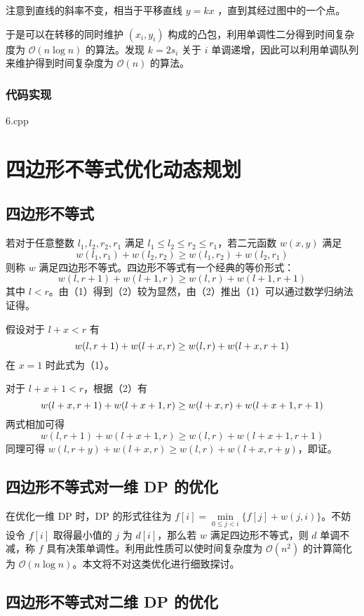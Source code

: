 \documentclass[a4paper, UTF8]{ctexart}
\begin{document}
注意到直线的斜率不变，相当于平移直线 \(y=kx\) ，直到其经过图中的一个点。


于是可以在转移的同时维护 \((x_i,y_i)\)
构成的凸包，利用单调性二分得到时间复杂度为 \(\mathcal{O}(n\log n)\)
的算法。发现 \(k=2s_i\) 关于 \(i\)
单调递增，因此可以利用单调队列来维护得到时间复杂度为 \(\mathcal{O}(n)\)
的算法。

\subsubsection{代码实现}

6.cpp

\section{四边形不等式优化动态规划}

\subsection{四边形不等式}

若对于任意整数 \(l_1,l_2,r_2,r_1\) 满足
\(l_1\le l_2\le r_2\le r_1\)，若二元函数 \(w(x,y)\) 满足 \[
w(l_1,r_1)+w(l_2,r_2)\ge w(l_1,r_2)+w(l_2,r_1)\tag{1}
\] 则称 \(w\) 满足四边形不等式。四边形不等式有一个经典的等价形式： \[
w(l,r+1)+w(l+1,r)\ge w(l,r)+w(l+1,r+1)\tag{2}
\] 其中
\(l < r\)。由（1）得到（2）较为显然，由（2）推出（1）可以通过数学归纳法证得。

假设对于 \(l+x < r\) 有 \[
w(l,r+1)+w(l+x,r)\ge w(l,r)+w(l+x,r+1)\\
\] 在 \(x=1\) 时此式为（1）。

对于 \(l+x+1 < r\)，根据（2）有 \[
w(l+x,r+1)+w(l+x+1,r)\ge w(l+x,r)+w(l+x+1,r+1)\\
\] 两式相加可得 \[
w(l,r+1)+w(l+x+1,r)\ge w(l,r)+w(l+x+1,r+1)
\] 同理可得 \(w(l,r+y)+w(l+x,r)\ge w(l,r)+w(l+x,r+y)\)，即证。

\subsection{四边形不等式对一维 DP 的优化}

在优化一维 DP 时，DP 的形式往往为
\(f[i]=\min\limits_{0\le j < i}\{f[j]+w(j,i)\}\)。不妨设令 \(f[i]\)
取得最小值的 \(j\) 为 \(d[i]\)，那么若 \(w\) 满足四边形不等式，则 \(d\)
单调不减，称 \(f\) 具有决策单调性。利用此性质可以使时间复杂度为
\(\mathcal{O}(n^2)\) 的计算简化为
\(\mathcal{O}(n\log n)\)。本文将不对这类优化进行细致探讨。

\subsection{四边形不等式对二维 DP 的优化}
\end{document}
